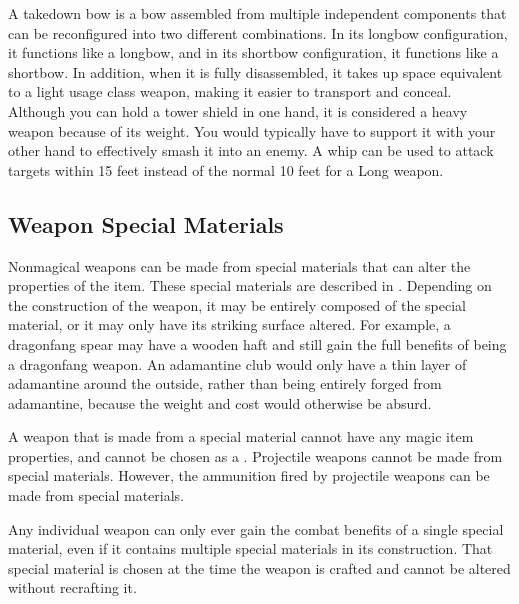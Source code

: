          A takedown bow is a bow assembled from multiple independent components that can be reconfigured into two different combinations.
        In its longbow configuration, it functions like a longbow, and in its shortbow configuration, it functions like a shortbow.
        In addition, when it is fully disassembled, it takes up space equivalent to a light usage class weapon, making it easier to transport and conceal.
         Although you can hold a tower shield in one hand, it is considered a heavy weapon because of its weight.
        You would typically have to support it with your other hand to effectively smash it into an enemy.
         A whip can be used to attack targets within 15 feet instead of the normal 10 feet for a Long weapon.

    \subsection{Weapon Special Materials}\label{Weapon Special Materials}
        Nonmagical weapons can be made from special materials that can alter the properties of the item.
        These special materials are described in .
        Depending on the construction of the weapon, it may be entirely composed of the special material, or it may only have its striking surface altered.
        For example, a dragonfang spear may have a wooden haft and still gain the full benefits of being a dragonfang weapon.
        An adamantine club would only have a thin layer of adamantine around the outside, rather than being entirely forged from adamantine, because the weight and cost would otherwise be absurd.

        A weapon that is made from a special material cannot have any magic item properties, and cannot be chosen as a .
        Projectile weapons cannot be made from special materials.
        However, the ammunition fired by projectile weapons can be made from special materials.

        Any individual weapon can only ever gain the combat benefits of a single special material, even if it contains multiple special materials in its construction.
        That special material is chosen at the time the weapon is crafted and cannot be altered without recrafting it.

